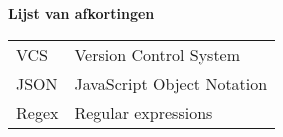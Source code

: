 \Large
\textbf{Lijst van afkortingen}
\newline
\small
\begin{table}[ht]
\small
\begin{tabular}{ll} 
VCS &Version Control System \\
JSON &JavaScript Object Notation \\
Regex &Regular expressions
\end{tabular}
\end{table}

\newpage
